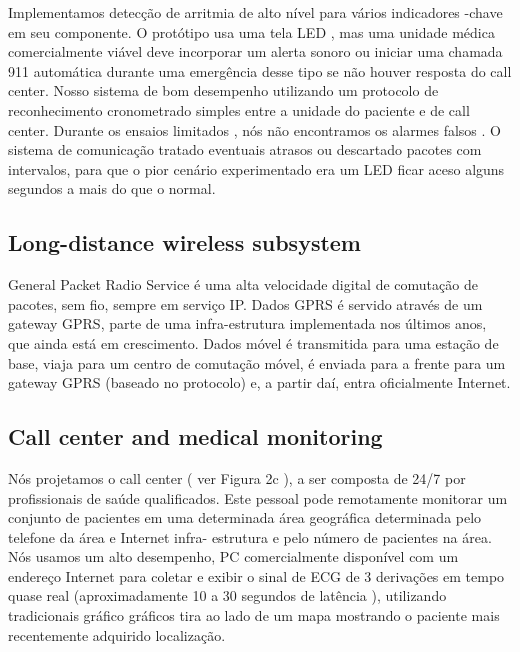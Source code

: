 \documentclass[a4paper,12pt]{article}
\begin{document}
Implementamos detecção de arritmia de alto nível para vários indicadores -chave em seu componente. O protótipo usa uma tela LED , mas uma unidade médica comercialmente viável deve incorporar um alerta sonoro ou iniciar uma chamada 911 automática durante uma emergência desse tipo se não houver resposta do call center. Nosso sistema de bom desempenho utilizando um protocolo de reconhecimento cronometrado simples entre a unidade do paciente e de call center. Durante os ensaios limitados , nós não encontramos os alarmes falsos . O sistema de comunicação tratado eventuais atrasos ou descartado pacotes com intervalos, para que o pior cenário experimentado era um LED ficar aceso alguns segundos a mais do que o normal.

\subsection{Long-distance wireless subsystem}

General Packet Radio Service é uma alta velocidade digital de comutação de pacotes, sem fio, sempre em serviço IP. Dados GPRS é servido através de um gateway GPRS, parte de uma infra-estrutura implementada nos últimos anos, que ainda está em crescimento. Dados móvel é transmitida para uma estação de base, viaja para um centro de comutação móvel, é enviada para a frente para um gateway GPRS (baseado no protocolo) e, a partir daí, entra oficialmente Internet.

\subsection{Call center and medical monitoring}

Nós projetamos o call center ( ver Figura 2c ), a ser composta de 24/7 por profissionais de saúde qualificados. Este pessoal pode remotamente monitorar um conjunto de pacientes em uma determinada área geográfica determinada pelo telefone da área e Internet infra- estrutura e pelo número de pacientes na área. Nós usamos um alto desempenho, PC comercialmente disponível com um endereço Internet para coletar e exibir o sinal de ECG de 3 derivações em tempo quase real (aproximadamente 10 a 30 segundos de latência ), utilizando tradicionais gráfico gráficos tira ao lado de um mapa mostrando o paciente mais recentemente adquirido localização.
\end{document}
